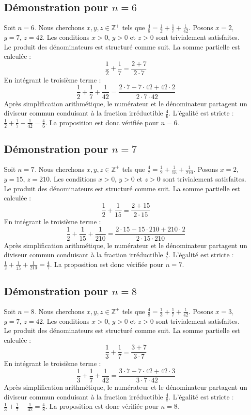 \documentclass[11pt,a4paper]{article}
\begin{document}
\subsection{Démonstration pour $n = 6$}
Soit $n = 6$. Nous cherchons $x, y, z \in \mathbb{Z}^{+}$ tels que $\frac{4}{6} = \frac{1}{2} + \frac{1}{7} + \frac{1}{42}$.
Posons $x = 2$, $y = 7$, $z = 42$.
Les conditions $x > 0$, $y > 0$ et $z > 0$ sont trivialement satisfaites.
Le produit des dénominateurs est structuré comme suit. La somme partielle est calculée :
$$ \frac{1}{2} + \frac{1}{7} = \frac{2+7}{2 \cdot 7} $$
En intégrant le troisième terme :
$$ \frac{1}{2} + \frac{1}{7} + \frac{1}{42} = \frac{2 \cdot 7 + 7 \cdot 42 + 42 \cdot 2}{2 \cdot 7 \cdot 42} $$
Après simplification arithmétique, le numérateur et le dénominateur partagent un diviseur commun conduisant à la fraction irréductible $\frac{4}{6}$.
L'égalité est stricte : $\frac{1}{2} + \frac{1}{7} + \frac{1}{42} = \frac{4}{6}$.
La proposition est donc vérifiée pour $n = 6$.
\subsection{Démonstration pour $n = 7$}
Soit $n = 7$. Nous cherchons $x, y, z \in \mathbb{Z}^{+}$ tels que $\frac{4}{7} = \frac{1}{2} + \frac{1}{15} + \frac{1}{210}$.
Posons $x = 2$, $y = 15$, $z = 210$.
Les conditions $x > 0$, $y > 0$ et $z > 0$ sont trivialement satisfaites.
Le produit des dénominateurs est structuré comme suit. La somme partielle est calculée :
$$ \frac{1}{2} + \frac{1}{15} = \frac{2+15}{2 \cdot 15} $$
En intégrant le troisième terme :
$$ \frac{1}{2} + \frac{1}{15} + \frac{1}{210} = \frac{2 \cdot 15 + 15 \cdot 210 + 210 \cdot 2}{2 \cdot 15 \cdot 210} $$
Après simplification arithmétique, le numérateur et le dénominateur partagent un diviseur commun conduisant à la fraction irréductible $\frac{4}{7}$.
L'égalité est stricte : $\frac{1}{2} + \frac{1}{15} + \frac{1}{210} = \frac{4}{7}$.
La proposition est donc vérifiée pour $n = 7$.
\subsection{Démonstration pour $n = 8$}
Soit $n = 8$. Nous cherchons $x, y, z \in \mathbb{Z}^{+}$ tels que $\frac{4}{8} = \frac{1}{3} + \frac{1}{7} + \frac{1}{42}$.
Posons $x = 3$, $y = 7$, $z = 42$.
Les conditions $x > 0$, $y > 0$ et $z > 0$ sont trivialement satisfaites.
Le produit des dénominateurs est structuré comme suit. La somme partielle est calculée :
$$ \frac{1}{3} + \frac{1}{7} = \frac{3+7}{3 \cdot 7} $$
En intégrant le troisième terme :
$$ \frac{1}{3} + \frac{1}{7} + \frac{1}{42} = \frac{3 \cdot 7 + 7 \cdot 42 + 42 \cdot 3}{3 \cdot 7 \cdot 42} $$
Après simplification arithmétique, le numérateur et le dénominateur partagent un diviseur commun conduisant à la fraction irréductible $\frac{4}{8}$.
L'égalité est stricte : $\frac{1}{3} + \frac{1}{7} + \frac{1}{42} = \frac{4}{8}$.
La proposition est donc vérifiée pour $n = 8$.
\end{document}
